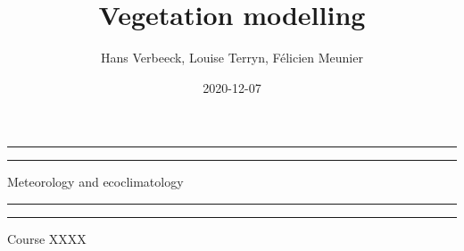 \documentclass[12pt,oneside]{book}
\title{Vegetation modelling}
\author{Hans Verbeeck, Louise Terryn, Félicien Meunier}
\date{2020-12-07}
\begin{document}
\maketitle

\newcommand{\plogo}{\fbox{$\mathcal{PL}$}} %
\frontmatter


\begin{titlepage} %

	\centering %
	
	\scshape %
	
	\vspace*{\baselineskip} %
	
	
	\vspace{12\baselineskip}
	
	\rule{\textwidth}{1.6pt}\vspace*{-\baselineskip}\vspace*{2pt} %
	\rule{\textwidth}{0.4pt} %
	
	\vspace{0.75\baselineskip} %
	
	{\LARGE Meteorology and ecoclimatology\\} %
	
	\vspace{0.75\baselineskip} %
	
	\rule{\textwidth}{0.4pt}\vspace*{-\baselineskip}\vspace{3.2pt} %
	\rule{\textwidth}{1.6pt} %
	
	\vspace{2\baselineskip} %
	
	
	Course XXXX %
	
	\vspace*{3\baselineskip} %
	
	

\end{titlepage}
\end{document}

